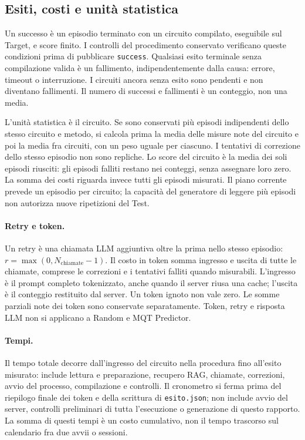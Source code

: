 \subsection{Esiti, costi e unità statistica}
Un successo è un episodio terminato con un circuito compilato, eseguibile sul
Target, e score finito. I controlli del procedimento conservato verificano queste
condizioni prima di pubblicare \texttt{success}. Qualsiasi esito terminale senza
compilazione valida è un fallimento, indipendentemente dalla causa: errore,
timeout o interruzione. I circuiti ancora senza esito sono pendenti e non diventano
fallimenti. Il numero di successi e fallimenti è un conteggio, non una media.

L'unità statistica è il circuito. Se sono conservati più episodi indipendenti
dello stesso circuito e metodo, si calcola prima la media delle misure note del
circuito e poi la media fra circuiti, con un peso uguale per ciascuno. I tentativi
di correzione dello stesso episodio non sono repliche. Lo score del circuito è
la media dei soli episodi riusciti: gli episodi falliti restano nei conteggi,
senza assegnare loro zero. La somma dei costi riguarda invece tutti gli episodi
misurati. Il piano corrente prevede un episodio per circuito; la capacità del
generatore di leggere più episodi non autorizza nuove ripetizioni del Test.

\paragraph{Retry e token.}
Un retry è una chiamata LLM aggiuntiva oltre la prima nello stesso episodio:
\(r=\max(0,N_{\mathrm{chiamate}}-1)\). Il costo in token somma ingresso e uscita
di tutte le chiamate, comprese le correzioni e i tentativi falliti quando
misurabili. L'ingresso è il prompt completo tokenizzato, anche quando il server
riusa una cache; l'uscita è il conteggio restituito dal server. Un token ignoto
non vale zero. Le somme parziali note dei token sono conservate separatamente.
Token, retry e risposta LLM non si applicano a Random e MQT Predictor.

\paragraph{Tempi.}
Il tempo totale decorre dall'ingresso del circuito nella procedura fino all'esito
misurato: include lettura e preparazione, recupero RAG, chiamate, correzioni,
avvio del processo, compilazione e controlli. Il cronometro si ferma prima del
riepilogo finale dei token e della scrittura di \texttt{esito.json}; non include
avvio del server, controlli preliminari di tutta l'esecuzione o generazione di
questo rapporto. La somma di questi tempi è un costo cumulativo, non il tempo
trascorso sul calendario fra due avvii o sessioni.

